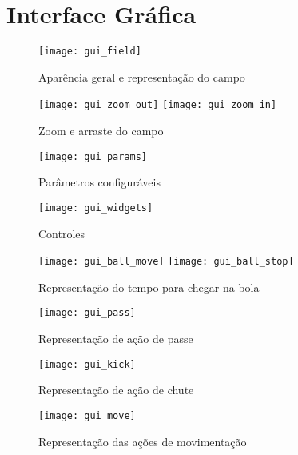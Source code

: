 \section{Interface Gráfica}\label{sec:gui}

\FloatBarrier

\begin{figure}[h!]
  \centering
  \texttt{[image: gui\_field]}
  \caption{Aparência geral e representação do campo}\label{fig:gui_field}
\end{figure}

\begin{figure}[h!]
  \centering
  \texttt{[image: gui\_zoom\_out]}
  \texttt{[image: gui\_zoom\_in]}
  \caption{Zoom e arraste do campo}\label{fig:gui_zoom}
\end{figure}

\begin{figure}[h!]
  \centering
  \texttt{[image: gui\_params]}
  \caption{Parâmetros configuráveis}\label{fig:gui_params}
\end{figure}

\begin{figure}[h!]
  \centering
  \texttt{[image: gui\_widgets]}
  \caption{Controles}\label{fig:gui_widgets}
\end{figure}

\begin{figure}[h!]
  \centering
  \texttt{[image: gui\_ball\_move]}
  \texttt{[image: gui\_ball\_stop]}
  \caption{Representação do tempo para chegar na bola}\label{fig:gui_ball}
\end{figure}

\begin{figure}[h!]
  \centering
  \texttt{[image: gui\_pass]}
  \caption{Representação de ação de passe}\label{fig:gui_pass}
\end{figure}

\begin{figure}[h!]
  \centering
  \texttt{[image: gui\_kick]}
  \caption{Representação de ação de chute}\label{fig:gui_kick}
\end{figure}

\begin{figure}[h!]
  \centering
  \texttt{[image: gui\_move]}
  \caption{Representação das ações de movimentação}\label{fig:gui_move}
\end{figure}

